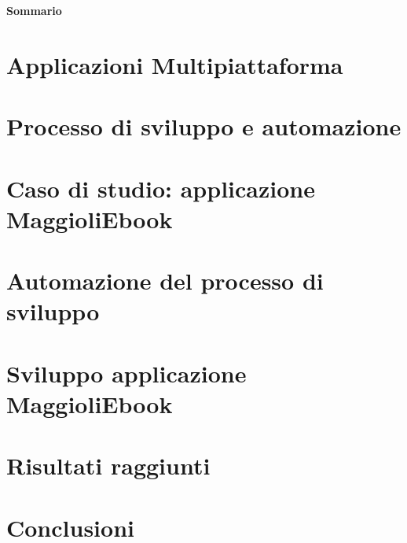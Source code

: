 \documentclass[12pt,a4paper]{report}
\begin{document}
\newpage

\begin{center}
{\LARGE{\bf Sommario}}
\end{center}
{
\noindent

}

\newpage

\tableofcontents

\chapter{Applicazioni Multipiattaforma}
\label{ch:ch1}


\chapter{Processo di sviluppo e automazione}
\label{ch:ch2}


\chapter{Caso di studio: applicazione MaggioliEbook}
\label{ch:ch3}


\chapter{Automazione del processo di sviluppo}
\label{ch:ch4}


\chapter{Sviluppo applicazione MaggioliEbook}
\label{ch:ch5}


\chapter{Risultati raggiunti}
\label{ch:ch6}


\chapter{Conclusioni}
\label{ch:ch7}

\end{document}
